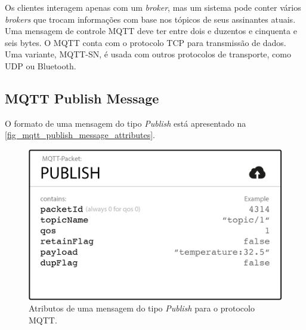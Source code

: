 \documentclass[
    12pt,
    openright,
    twoside,
    a4paper,
    english,
    spanish,
    brazil,
    ]{abntex2}
\begin{document}
Os clientes interagem apenas com um \textit{broker}, mas um sistema pode conter vários \textit{brokers} que trocam informações com base nos tópicos de seus assinantes atuais. Uma mensagem de controle MQTT deve ter entre dois e duzentos e cinquenta e seis bytes. O MQTT conta com o protocolo TCP para transmissão de dados. Uma variante, MQTT-SN, é usada com outros protocolos de transporte, como UDP ou Bluetooth.

\subsection{MQTT Publish Message}\label{section_mqtt_publish_message}
O formato de uma mensagem do tipo \textit{Publish} está apresentado na \autoref{fig_mqtt_publish_message_attributes}.
\begin{figure}[htb]
	\begin{center}
		\caption{Atributos de uma mensagem do tipo \textit{Publish} para o protocolo MQTT.}\label{fig_mqtt_publish_message_attributes}
		\includegraphics[scale=0.5]{Images/mqtt_publish_message_attributes.png}
	\end{center}
\end{figure}
\end{document}
